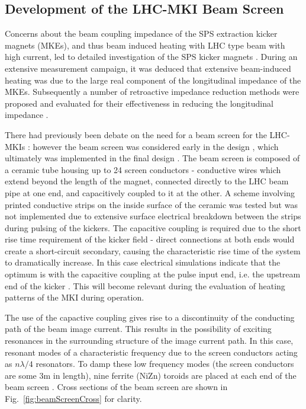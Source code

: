 \subsection{Development of the LHC-MKI Beam Screen}
\label{sec:mki-screen-development}

Concerns about the beam coupling impedance of the SPS extraction kicker magnets (MKEs), and thus beam induced heating with LHC type beam with high current, led to detailed investigation of the SPS kicker magnets \cite{Arduini:beamInducedSPS}. During an extensive measurement campaign, it was deduced that extensive beam-induced heating was due to the large real component of the longitudinal impedance of the MKEs. Subsequently a number of retroactive impedance reduction methods were proposed and evaluated for their effectiveness in reducing the longitudinal impedance \cite{Kroyer:MKEReduct}.

There had previously been debate on the need for a beam screen for the LHC-MKIs \cite{Vos:beamScreen}: however the beam screen was considered early in the design \cite{Ducimetiere:designMKI}, which ultimately was implemented in the final design \cite{Barnes:improvBeamScreen}. The beam screen is composed of a ceramic tube housing up to 24 screen conductors - conductive wires which extend beyond the length of the magnet, connected directly to the LHC beam pipe at one end, and capacitively coupled to it at the other. A scheme involving printed conductive strips on the inside surface of the ceramic was tested but was not implemented due to extensive surface electrical breakdown between the strips during pulsing of the kickers. The capacitive coupling is required due to the short rise time requirement of the kicker field - direct connections at both ends would create a short-circuit secondary, causing the characteristic rise time of the system to dramatically increase. In this case electrical simulations indicate that the optimum is with the capacitive coupling at the pulse input end, i.e. the upstream end of the kicker \cite{Barnes:improvBeamScreen}. This will become relevant during the evaluation of heating patterns of the MKI during operation.

The use of the capactive coupling gives rise to a discontinuity of the conducting path of the beam image current. This results in the possibility of exciting resonances in the surrounding structure of the image current path. In this case, resonant modes of a characteristic frequency due to the screen conductors acting as $n \lambda /4$ resonators. To damp these low frequency modes (the screen conductors are some 3m in length), nine ferrite (NiZn) toroids are placed at each end of the beam screen \cite{Caspers:impMeasMKI, Caspera:impMeasLowFreqMKI, Barnes:mkiVacTemp}. Cross sections of the beam screen are shown in Fig.~\ref{fig:beamScreenCross} for clarity.

